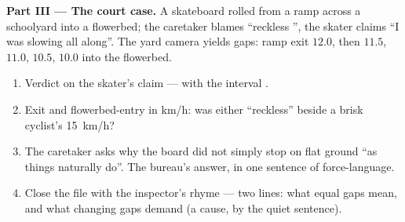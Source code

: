 \begin{problem}
\medskip\noindent\textbf{Part III --- The court case.}
A skateboard rolled from a ramp across a schoolyard into a
flowerbed; the caretaker blames ``reckless '', the
skater claims ``I was slowing all along''. The yard camera
yields gaps: ramp exit $12.0$, then $11.5$, $11.0$,
$10.5$, $10.0$ into the flowerbed.
\begin{enumerate}[resume]
  \item Verdict on the skater's claim --- with the interval
        .
  \item Exit  and flowerbed-entry  in
        \unit{km/h}: was either ``reckless'' beside a
        brisk cyclist's \qty{15}{km/h}?
  \item The caretaker asks why the board did not simply
        stop on flat ground ``as things naturally do''.
        The bureau's answer, in one sentence of
        force-language.
  \item Close the file with the inspector's rhyme --- two
        lines: what equal gaps mean, and what changing
        gaps demand (a cause, by the quiet sentence).
\end{enumerate}
\end{problem}
